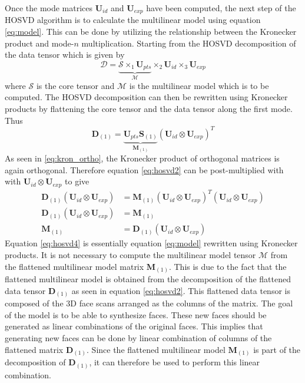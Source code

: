 \documentclass[11pt,a4paper]{report}
\begin{document}
Once the mode matrices $\mathbf{U}_{id}$ and $\mathbf{U}_{exp}$ have been
computed, the next step of the HOSVD algorithm is to calculate the multilinear model using equation
\ref{eq:model}. This can be done by utilizing the relationship between the
Kronecker product and mode-$n$ multiplication. Starting from the HOSVD
decomposition of the data tensor which is given by
\begin{equation}
\mathcal{D} = \underbrace{\mathcal{S} \times_1 \mathbf{U}_{pts}}_{\mathcal{M}} \times_2 \mathbf{U}_{id} \times_3 \mathbf{U}_{exp}
\end{equation}
where $\mathcal{S}$ is the core tensor and $\mathcal{M}$ is the multilinear
model which is to be computed. The HOSVD decomposition can then be
rewritten using Kronecker products by flattening the core tensor and the data
tensor along the first mode. Thus 
\begin{equation}\label{eq:hosvd2}
\mathbf{D}_{(1)} = \underbrace{\mathbf{U}_{pts}\mathbf{S}_{(1)}}_{\mathbf{M}_{(1)}} (\mathbf{U}_{id} \otimes \mathbf{U}_{exp})^T
\end{equation}
As seen in \ref{eq:kron_ortho}, the Kronecker product of orthogonal matrices is
again orthogonal. Therefore equation \ref{eq:hosvd2} can be post-multiplied with
with $\mathbf{U}_{id} \otimes \mathbf{U}_{exp}$ to give
\begin{align}
\mathbf{D}_{(1)} (\mathbf{U}_{id} \otimes \mathbf{U}_{exp}) &= \mathbf{M}_{(1)}
(\mathbf{U}_{id} \otimes \mathbf{U}_{exp})^T (\mathbf{U}_{id} \otimes
\mathbf{U}_{exp})\nonumber\\
\mathbf{D}_{(1)} (\mathbf{U}_{id} \otimes \mathbf{U}_{exp}) &=
\mathbf{M}_{(1)}\nonumber\\
\label{eq:hosvd4}
\mathbf{M}_{(1)} &= \mathbf{D}_{(1)} (\mathbf{U}_{id} \otimes \mathbf{U}_{exp})
\end{align}
Equation \ref{eq:hosvd4} is essentially equation \ref{eq:model} rewritten using Kronecker
products. It is not necessary to compute the
multilinear model tensor $\mathcal{M}$ from the flattened multilinear
model matrix $\mathbf{M}_{(1)}$. This is due to the fact that the flattened multilinear
model is obtained from the decomposition of the flattened data tensor
$\mathbf{D}_{(1)}$ as seen in equation \ref{eq:hosvd2}. This flattened data
tensor is composed of the 3D face scans arranged as the columns of the
matrix. The goal of the model is to be able to synthesize faces. These new faces
should be generated as linear combinations of the
original faces. This implies that generating new faces can be done by linear
combination of columns of the flattened matrix $\mathbf{D}_{(1)}$. Since the
flattened multilinear model $\mathbf{M}_{(1)}$ is part of the decomposition of
$\mathbf{D}_{(1)}$, it can therefore be used to perform this
linear combination.
\end{document}
